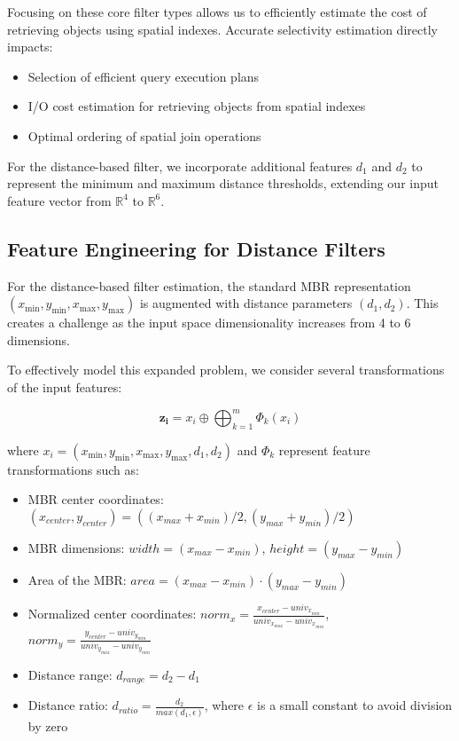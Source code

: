 \documentclass{article}
\begin{document}
Focusing on these core filter types allows us to efficiently estimate the cost of retrieving objects using spatial indexes. Accurate selectivity estimation directly impacts:
\begin{itemize}
\item Selection of efficient query execution plans
\item I/O cost estimation for retrieving objects from spatial indexes  
\item Optimal ordering of spatial join operations
\end{itemize}

For the distance-based filter, we incorporate additional features $d_1$ and $d_2$ to represent the minimum and maximum distance thresholds, extending our input feature vector from $\mathbb{R}^4$ to $\mathbb{R}^6$.
\subsection{Feature Engineering for Distance Filters}

For the distance-based filter estimation, the standard MBR representation $(x_{\min}, y_{\min}, x_{\max}, y_{\max})$ is augmented with distance parameters $(d_1, d_2)$. This creates a challenge as the input space dimensionality increases from 4 to 6 dimensions.

To effectively model this expanded problem, we consider several transformations of the input features:

\begin{equation}
\mathbf{z_i} = x_i \oplus \bigoplus_{k=1}^m \Phi_k(x_i)
\end{equation}

where $x_i = (x_{\min}, y_{\min}, x_{\max}, y_{\max}, d_1, d_2)$ and $\Phi_k$ represent feature transformations such as:
\begin{itemize}
\item MBR center coordinates: $(x_{center}, y_{center}) = ((x_{max} + x_{min})/2, (y_{max} + y_{min})/2)$
\item MBR dimensions: $width = (x_{max} - x_{min})$, $height = (y_{max} - y_{min})$
\item Area of the MBR: $area = (x_{max} - x_{min}) \cdot (y_{max} - y_{min})$
\item Normalized center coordinates: $norm_x = \frac{x_{center} - univ_{x_{min}}}{univ_{x_{max}} - univ_{x_{min}}}$, $norm_y = \frac{y_{center} - univ_{y_{min}}}{univ_{y_{max}} - univ_{y_{min}}}$
\item Distance range: $d_{range} = d_2 - d_1$
\item Distance ratio: $d_{ratio} = \frac{d_2}{max(d_1, \epsilon)}$, where $\epsilon$ is a small constant to avoid division by zero
\end{itemize}
\end{document}
